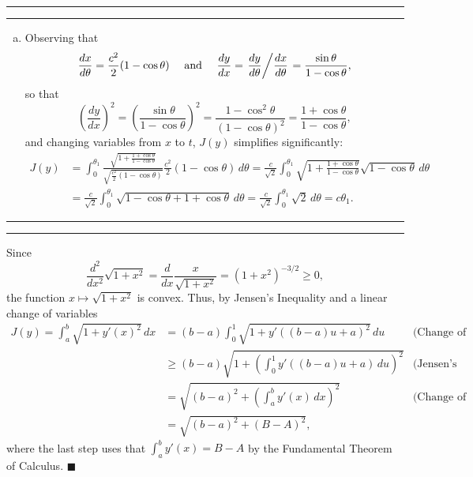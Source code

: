 \documentclass[11pt]{article}
\newcounter{questionCounter}
\newcounter{partCounter}[questionCounter]
\newenvironment{question}[2][\arabic{questionCounter}]{%
    \setcounter{partCounter}{0}%
    \vspace{.25in} \hrule \vspace{0.5em}%
        \noindent{\bf #2}%
    \vspace{0.8em} \hrule \vspace{.10in}%
    \addtocounter{questionCounter}{1}%
}{}
\renewcommand{\qed}{\quad \ensuremath{\blacksquare}}
\begin{document}
\begin{question}{Problem 1}
\begin{enumerate}[(a)]
\item Observing that
\[\frac{dx}{d\theta} = \frac{c^2}{2} (1 - \cos\theta)
\quad \mbox{ and } \quad
\frac{dy}{dx}
    = \left. \frac{dy}{d\theta} \middle/ \frac{dx}{d\theta} \right.
    = \frac{\sin\theta}{1 - \cos\theta},
\]
so that
\[\left( \frac{dy}{dx} \right)^2
    = \left( \frac{\sin\theta}{1 - \cos\theta} \right)^2
    = \frac{1 - \cos^2\theta}{(1 - \cos\theta)^2}
    = \frac{1 + \cos\theta}{1 - \cos\theta},
\]
and changing variables from $x$ to $t$, $J(y)$ simplifies significantly:
\begin{align*}
J(y)
 &  = \int_0^{\theta_1} \frac{\sqrt{1 + \frac{1 + \cos \theta}
                                                {1 - \cos\theta}}}
                        {\sqrt{\frac{c^2}{2}(1 - \cos\theta)}}
      \frac{c^2}{2} (1 - \cos\theta) \, d\theta
    = \frac{c}{\sqrt2} \int_0^{\theta_1} \sqrt{1 + \frac{1 + \cos \theta}
                                                {1 - \cos\theta}}
      \sqrt{1 - \cos\theta} \, d\theta   \\
 &  = \frac{c}{\sqrt2} \int_0^{\theta_1}
                        \sqrt{1 - \cos\theta + 1 + \cos\theta} \, d\theta
    = \frac{c}{\sqrt2} \int_0^{\theta_1}
                        \sqrt{2} \, d\theta = c\theta_1.
\end{align*}
\end{enumerate}
\end{question}

\begin{question}{Problem 2}
Since
\[\frac{d^2}{dx^2} \sqrt{1 + x^2}
    = \frac{d}{dx} \frac{x}{\sqrt{1 + x^2}}
    = \left( 1 + x^2 \right)^{-3/2}
    \geq 0,\]
the function $x \mapsto \sqrt{1 + x^2}$ is convex.
Thus, by Jensen's Inequality and a linear change of variables
\begin{align*}
J(y)
    = \int_a^b \sqrt{1 + y'(x)^2} \, dx
 &  = (b - a) \int_0^1 \sqrt{1 + y'((b - a)u + a)^2} \, du
 &  \mbox{(Change of Variables)}    \\
 &  \geq (b - a) \sqrt{1 + \left( \int_0^1 y'((b - a)u + a) \, du \right)^2}
 &  \mbox{(Jensen's Inequality)}    \\
 &  = \sqrt{(b - a)^2 + \left( \int_a^b y'(x) \, dx \right)^2}
 &  \mbox{(Change of Variables)}    \\
 &  = \sqrt{(b - a)^2 + (B - A)^2},
\end{align*}
where the last step uses that $\int_a^b y'(x) = B - A$ by the Fundamental
Theorem of Calculus. \qed
\end{question}
\end{document}
